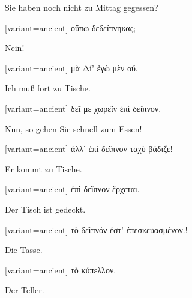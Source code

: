 Sie haben noch nicht zu Mittag gegessen?

\switchcolumn

\begin{greek}[variant=ancient]%
οὔπω δεδείπνηκας;

\end{greek}%
\switchcolumn*

Nein!

\switchcolumn

\begin{greek}[variant=ancient]%
μὰ Δί' ἐγὼ μὲν οὔ.

\end{greek}%
\switchcolumn*

Ich muß fort zu Tische.

\switchcolumn

\begin{greek}[variant=ancient]%
δεῖ με χωρεῖν ἐπὶ δεῖπνον.

\end{greek}%
\switchcolumn*

Nun, so gehen Sie schnell zum Essen!

\switchcolumn

\begin{greek}[variant=ancient]%
ἀλλ' ἐπὶ δεῖπνον ταχὺ βάδιζε!

\end{greek}%
\switchcolumn*

Er kommt zu Tische.

\switchcolumn

\begin{greek}[variant=ancient]%
ἐπὶ δεῖπνον ἔρχεται.

\end{greek}%
\switchcolumn*

Der Tisch ist gedeckt.

\switchcolumn

\begin{greek}[variant=ancient]%
τὸ δεῖπνόν ἐστ' ἐπεσκευασμένον.!

\end{greek}%
\switchcolumn*

Die Tasse.

\switchcolumn

\begin{greek}[variant=ancient]%
τὸ κύπελλον.

\end{greek}%
\switchcolumn*

Der Teller.

